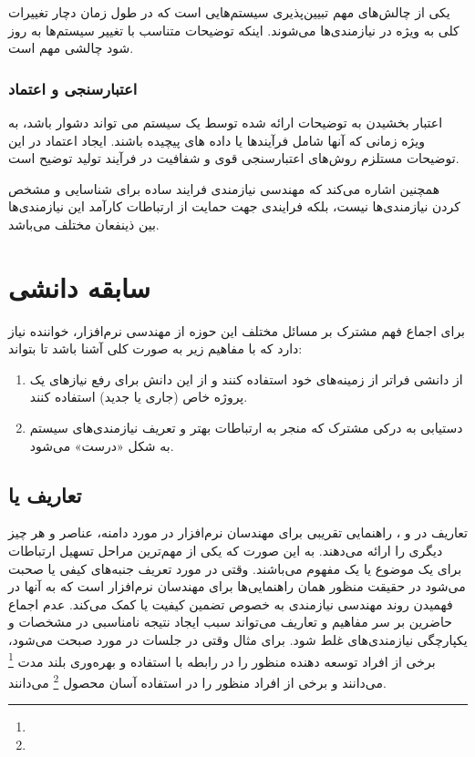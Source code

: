 یکی از چالش‌های مهم تبیین‌پذیری سیستم‌هایی است که در طول زمان دچار تغییرات کلی
به ویژه در نیازمندی‌ها می‌شوند. اینکه توضیحات متناسب با تغییر سیستم‌ها به روز
شود چالشی مهم است.

\subsubsection{اعتبارسنجی و اعتماد}

اعتبار بخشیدن به توضیحات ارائه شده توسط یک سیستم می تواند دشوار باشد، به ویژه
زمانی که آنها شامل فرآیندها یا داده های پیچیده باشند. ایجاد اعتماد در این
توضیحات مستلزم روش‌های اعتبارسنجی قوی و شفافیت در فرآیند تولید توضیح است.

همچنین اشاره می‌کند که مهندسی نیازمندی فرایند ساده برای شناسایی و مشخص کردن
نیازمندی‌ها نیست، بلکه فرایندی جهت حمایت از ارتباطات کارآمد این نیازمندی‌ها بین
ذینفعان مختلف می‌باشد.

\section{سابقه دانشی}

برای اجماع فهم مشترک بر مسائل مختلف این حوزه از مهندسی نرم‌افزار، خواننده نیاز
دارد که با مفاهیم زیر به صورت کلی آشنا باشد تا بتواند:

\begin{enumerate}
    \item از دانشی فراتر از زمینه‌های خود استفاده کنند و از این دانش برای رفع
    نیاز‌های یک پروژه خاص (جاری یا جدید) استفاده کنند.
    \item دستیابی به درکی مشترک که منجر به ارتباطات بهتر و تعریف نیازمندی‌های
    سیستم به شکل «درست» می‌شود.
\end{enumerate}

\subsection{تعاریف یا }

تعاریف در  و ، راهنمایی تقریبی برای مهندسان نرم‌افزار در مورد
دامنه، عناصر و هر چیز دیگری را ارائه می‌دهند. به این صورت که یکی از مهم‌ترین
مراحل تسهیل ارتباطات برای یک موضوع یا یک مفهوم می‌باشند. وقتی در مورد تعریف
جنبه‌های کیفی یا  صحبت می‌شود در حقیقت منظور همان
راهنمایی‌ها برای مهندسان نرم‌افزار است که به آنها در فهمیدن روند مهندسی نیازمندی
به خصوص تضمین کیفیت یا  کمک می‌کند. عدم اجماع حاضرین بر سر
مفاهیم و تعاریف می‌تواند سبب ایجاد نتیجه نامناسبی در مشخصات و یکپارچگی
نیازمندی‌های غلط شود. برای مثال وقتی در جلسات در مورد  صبحت
می‌شود، برخی از افراد توسعه دهنده منظور را در رابطه با استفاده و بهره‌وری بلند
مدت \footnote{} می‌دانند و برخی از افراد منظور را در
استفاده آسان محصول \footnote{} می‌دانند.


